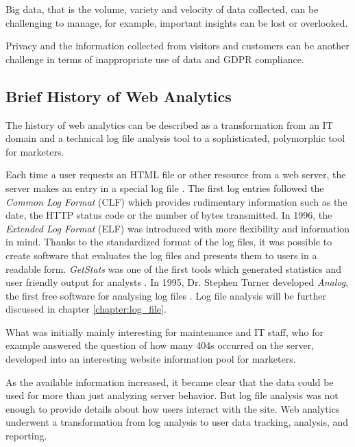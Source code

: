 Big data, that is the volume, variety and velocity of data collected, can be challenging to manage,
for example, important insights can be lost or overlooked.

Privacy and the information collected from visitors and customers can be another challenge in terms of inappropriate use of data and GDPR compliance.





\subsection{Brief History of Web Analytics}
\label{chapter:web_analytics_history}

The history of web analytics can be described as a transformation from an IT domain and a technical log file analysis tool to a sophisticated, polymorphic tool for marketers.

Each time a user requests an HTML file or other resource from a web server, the server makes an entry in a special log file \cite{2014Singal}.
The first log entries followed the \textit{Common Log Format} (CLF) which provides rudimentary information such as the date, the HTTP status code or the number of bytes transmitted.
In 1996, the \textit{Extended Log Format} (ELF) was introduced with more flexibility and information in mind.
Thanks to the standardized format of the log files, it was possible to create software that evaluates the log files and presents them to users in a readable form.
\textit{GetStats} was one of the first tools which generated statistics and user friendly output for analysts \cite{2009Croll}. %
In 1995, Dr. Stephen Turner developed \textit{Analog}, the first free software for analysing log files \cite{2015Zheng}.
Log file analysis will be further discussed in chapter \ref{chapter:log_file}.

What was initially mainly interesting for maintenance and IT staff, who for example answered the question of how many 404s occurred on the server, developed into an interesting website information pool for marketers.

As the available information increased, it became clear that the data could be used for more than just analyzing server behavior.
But log file analysis was not enough to provide details about how users interact with the site.
Web analytics underwent a transformation from log analysis to user data tracking, analysis, and reporting.

